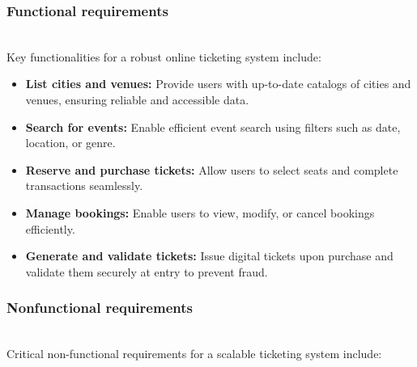\subsubsection{Functional requirements}\label{tR3ZGDmJHm_eP0IpdTAR3}
\\
Key functionalities for a robust online ticketing system include:

\begin{itemize}
\item
\protect{}\label{76oXsP1tW_u39DJk5Z5hS}
\textbf{List cities and venues:} Provide users with up-to-date catalogs of cities and venues, ensuring reliable and accessible data.
\item
\protect{}\label{ZoWr5jaXY8CZJw_RBEBRR}
\textbf{Search for events:} Enable efficient event search using filters such as date, location, or genre.
\item
\protect{}\label{7m7be9zgkI--dkde-705s}
\textbf{Reserve and purchase tickets:} Allow users to select seats and complete transactions seamlessly.
\item
\protect{}\label{rHMpjyIqpHWXHA1xk7Bbs}
\textbf{Manage bookings:} Enable users to view, modify, or cancel bookings efficiently.
\item
\protect{}\label{glMb2TVv8vSQDLY0kIDip}
\textbf{Generate and validate tickets:} Issue digital tickets upon purchase and validate them securely at entry to prevent fraud.
\end{itemize}

\subsubsection{Nonfunctional requirements}\label{QN8P_PgucN5Mf3boVYA_P}
\\
Critical non-functional requirements for a scalable ticketing system include:

